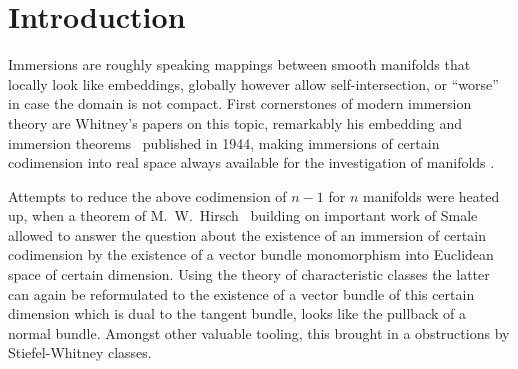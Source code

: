 % 

\chapter*{Introduction} %


Immersions are roughly speaking mappings between smooth
manifolds that locally look like embeddings, globally however
allow self-intersection, or \enquote{worse} in case the domain is not
compact.
First cornerstones of modern immersion theory are Whitney's papers on this
topic, remarkably his embedding and immersion
theorems~\cite{whitneyimmersiontheorem} published in 1944, making
immersions of certain codimension into real space always available for the
investigation of manifolds
\cite{immersiontheoryhistory,hirsch}.

Attempts to reduce the above codimension of $n-1$ for $n$ manifolds
were heated up, when a theorem of
M.~W.~Hirsch~\cite{hirschimmersions} building on important work of
Smale allowed to answer the question about the existence of an
immersion of certain codimension by the 
existence of a vector bundle monomorphism into Euclidean space of
certain dimension.
Using the theory of characteristic classes the latter can again be
reformulated to the existence of a vector bundle of this certain
dimension which is dual to the tangent bundle, \idest looks
like the pullback of a normal bundle.
Amongst other valuable tooling, this brought in a obstructions by
Stiefel-Whitney classes.

